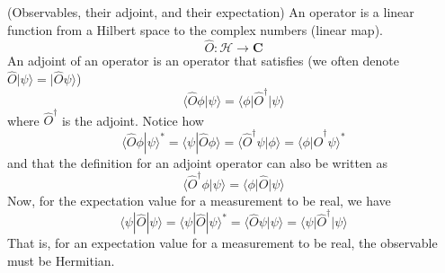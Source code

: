 \begin{defi}
(Observables, their adjoint, and their expectation) An operator is a linear function from a Hilbert space to the complex numbers (linear map).
\[\hat{O}:\mathcal{H}\rightarrow {\bm C}\]
An adjoint of an operator is an operator that satisfies (we often denote $\hat{O}|\psi \rangle =|\hat{O}\psi \rangle $)
\[\langle \hat{O}\phi |\psi \rangle =\langle \phi |\hat{O}^{\dagger}|\psi \rangle \]
where $\hat{O}^{\dagger}$ is the adjoint. Notice how 
\[\langle \hat{O}\phi |\psi \rangle ^{*}=\langle \psi |\hat{O}\phi \rangle =\langle \hat{O}^{\dagger}\psi |\phi \rangle =\langle \phi |\hat{O}^{\dagger}\psi \rangle ^{*}\]
and that the definition for an adjoint operator can also be written as 
\[\langle \hat{O}^{\dagger}\phi |\psi \rangle =\langle \phi |\hat{O}|\psi \rangle \]
Now, for the expectation value for a measurement to be real, we have 
\[\langle \psi |\hat{O}|\psi \rangle =\langle \psi |\hat{O}|\psi \rangle^{*}=\langle \hat{O}\psi |\psi \rangle =\langle \psi |\hat{O}^{\dagger}|\psi \rangle  \]
That is, for an expectation value for a measurement to be real, the observable must be Hermitian. 
\end{defi}
\vspace{2ex}

